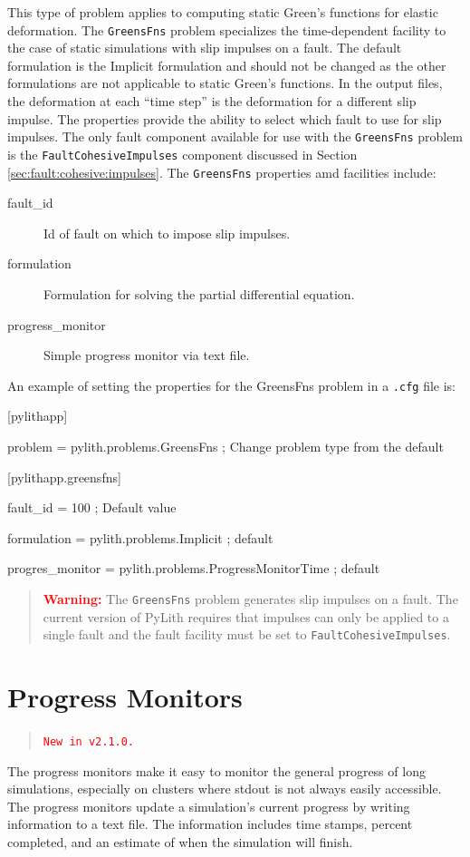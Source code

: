 This type of problem applies to computing static Green's functions
for elastic deformation. The \texttt{GreensFns} problem specializes
the time-dependent facility to the case of static simulations with
slip impulses on a fault. The default formulation is the Implicit
formulation and should not be changed as the other formulations are
not applicable to static Green's functions. In the output files, the
deformation at each ``time step'' is the deformation for a different
slip impulse. The properties provide the ability to select which fault
to use for slip impulses. The only fault component available for use
with the \texttt{GreensFns} problem is the \texttt{FaultCohesiveImpulses}
component discussed in Section \vref{sec:fault:cohesive:impulses}.
The \texttt{GreensFns} properties amd facilities include:
\begin{description}
\item [{fault\_id}] Id of fault on which to impose slip impulses.
\item [{formulation}] Formulation for solving the partial differential
equation.
\item [{progress\_monitor}] Simple progress monitor via text file.
\end{description}
An example of setting the properties for the GreensFns problem in
a \texttt{.cfg} file is:
\begin{lyxcode}
{[}pylithapp{]}

problem = pylith.problems.GreensFns ; Change problem type from the default



{[}pylithapp.greensfns{]}

fault\_id = 100 ; Default value

formulation = pylith.problems.Implicit ; default

progres\_monitor = pylith.problems.ProgressMonitorTime ; default

\end{lyxcode}
\begin{quote}
\textbf{\textcolor{red}{Warning:}} The \texttt{GreensFns} problem
generates slip impulses on a fault. The current version of PyLith
requires that impulses can only be applied to a single fault and the
fault facility must be set to \texttt{FaultCohesiveImpulses}.
\end{quote}

\section{Progress Monitors}
\begin{quotation}
\texttt{\textcolor{red}{New in v2.1.0.}}
\end{quotation}
The progress monitors make it easy to monitor the general progress
of long simulations, especially on clusters where stdout is not always
easily accessible. The progress monitors update a simulation's current
progress by writing information to a text file. The information includes
time stamps, percent completed, and an estimate of when the simulation
will finish. 


